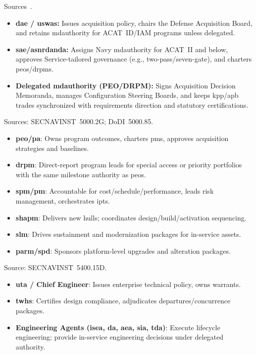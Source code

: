 \documentclass[../main.tex]{subfiles}
\begin{document}
\begin{description}[style=nextline, labelsep=0.5em, font=\bfseries]
\item[\textbf{Acquisition decision authorities.}]
Sources~\autocite{DoDD5000-01,DoDI5000-85,SECNAV5000-2G}.
      \begin{itemize}
        \item \textbf{\ac{dae} / \ac{uswas}:} Issues acquisition policy, chairs the Defense Acquisition Board, and retains \ac{mdauthority} for ACAT~ID/IAM programs unless delegated.
        \item \textbf{\ac{sae}/\ac{asnrdanda}:} Assigns Navy \ac{mdauthority} for ACAT~II and below, approves Service-tailored governance (e.g., two-pass/seven-gate), and charters \acp{peo}/\acp{drpm}.
        \item \textbf{Delegated \ac{mdauthority} (PEO/DRPM):} Signs Acquisition Decision Memoranda, manages Configuration Steering Boards, and keeps \ac{kpp}/\ac{apb} trades synchronized with requirements direction and statutory certifications.
      \end{itemize}

	\item[\textbf{Program Authority chain.}]
	Sources: SECNAVINST~5000.2G; DoDI~5000.85.
      \begin{itemize}
        \item \textbf{\ac{peo}/\ac{pa}}: Owns program outcomes, charters \acp{pm}, approves acquisition strategies and baselines.
        \item \textbf{\ac{drpm}}: Direct-report program leads for special access or priority portfolios with the same milestone authority as \acp{peo}.
        \item \textbf{\ac{spm}/\ac{pm}}: Accountable for cost/schedule/performance, leads risk management, orchestrates \acp{ipt}.
        \item \textbf{\ac{shapm}}: Delivers new hulls; coordinates design/build/activation sequencing.
        \item \textbf{\ac{slm}}: Drives sustainment and modernization packages for in-service assets.
        \item \textbf{\ac{parm}/\ac{spd}}: Sponsors platform-level upgrades and alteration packages.
      \end{itemize}

	\item[\textbf{Technical Authority chain.}]
	Source: SECNAVINST~5400.15D.
      \begin{itemize}
        \item \textbf{\ac{uta} / Chief Engineer}: Issues enterprise technical policy, owns warrants.
        \item \textbf{\acp{twh}}: Certifies design compliance, adjudicates departures/concurrence packages.
        \item \textbf{Engineering Agents (\ac{isea}, \ac{da}, \ac{aea}, \ac{sia}, \ac{tda})}: Execute lifecycle engineering; provide in-service engineering decisions under delegated authority.
      \end{itemize}


\end{description}
\end{document}
